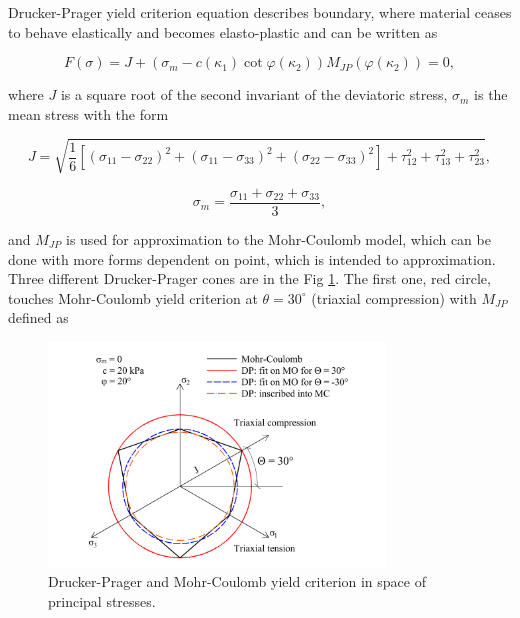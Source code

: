 Drucker-Prager yield criterion equation describes boundary, where material ceases to behave elastically and becomes elasto-plastic and can be written as  

\begin{equation}\label{eq:f_yc}
	F(\sigma) = J + (\sigma_m-c(\kappa_{1}) \cot \varphi(\kappa_{2}) )M_{JP}(\varphi(\kappa_{2})) = 0,
\end{equation}

where $J$ is a square root of the second invariant of the deviatoric stress, $\sigma_m$ is the mean stress with the form 
 
\begin{equation}\label{eq:f_J_sigM}
	J = \sqrt{\dfrac{1}{6} \left[(\sigma_{11}-\sigma_{22})^{2} + (\sigma_{11}-\sigma_{33})^{2} + (\sigma_{22}-\sigma_{33})^{2}\right] + \tau_{12}^{2} + \tau_{13}^{2}+ \tau_{23}^{2}},
\end{equation}


\begin{equation}\label{eq:f_sigM}
	\sigma_m = \dfrac{\sigma_{11} + \sigma_{22} + \sigma_{33}}{3},
\end{equation}

and $M_{JP}$ is used for approximation to the Mohr-Coulomb model, which can be done with more forms dependent on point, which is intended to approximation. Three different Drucker-Prager cones are in the Fig \ref{obr:F1}. The first one, red circle, touches Mohr-Coulomb yield criterion at $\theta = 30^\circ$ (triaxial compression) with $M_{JP}$ defined as

\begin{figure}[h!]
	\centering	
	\includegraphics[width=0.8\textwidth, angle=0]{obrazky/drucker-prager_eng.png}
	\caption[Drucker-Prager a Mohr-Coulomb model $T$]{Drucker-Prager and Mohr-Coulomb yield criterion in space of principal stresses. \label{obr:F1}}
\end{figure}



